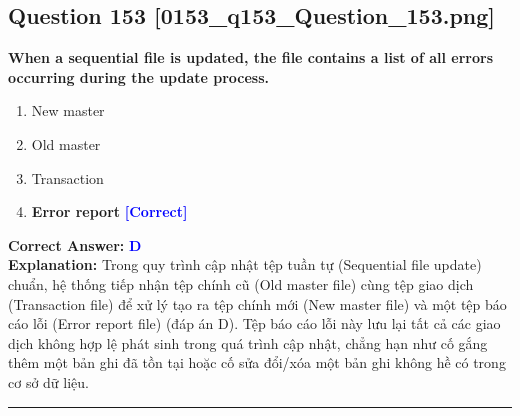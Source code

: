 \documentclass[11pt,a4paper]{article}
\begin{document}
\begin{minipage}{\textwidth}
\subsection*{Question 153 \quad \footnotesize{[0153\_q153\_Question\_153.png]}}
\noindent \textbf{When a sequential file is updated, the file contains a list of all errors occurring during the update process.}

\begin{enumerate}[label=\Alph*.]
    \item New master
    \item Old master
    \item Transaction
    \item \textbf{Error report} \hfill \textcolor{blue}{\textbf{[Correct]}}
\end{enumerate}

\noindent \textbf{Correct Answer:} \textcolor{blue}{\textbf{D}} \\[2pt]
\noindent \textbf{Explanation:} Trong quy trình cập nhật tệp tuần tự (Sequential file update) chuẩn, hệ thống tiếp nhận tệp chính cũ (Old master file) cùng tệp giao dịch (Transaction file) để xử lý tạo ra tệp chính mới (New master file) và một tệp báo cáo lỗi (Error report file) (đáp án D). Tệp báo cáo lỗi này lưu lại tất cả các giao dịch không hợp lệ phát sinh trong quá trình cập nhật, chẳng hạn như cố gắng thêm một bản ghi đã tồn tại hoặc cố sửa đổi/xóa một bản ghi không hề có trong cơ sở dữ liệu.

\par\vspace{0.3cm}
\hrule
\vspace{0.3cm}
\end{minipage}
\end{document}
